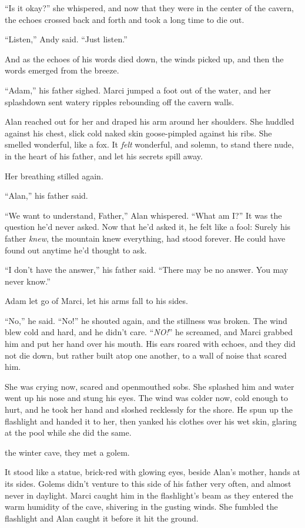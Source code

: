 ``Is it okay?'' she whispered, and now that they were in the center of
the cavern, the echoes crossed back and forth and took a long time to
die out.

``Listen,'' Andy said.  ``Just listen.''

And as the echoes of his words died down, the winds picked up, and
then the words emerged from the breeze.

``Adam,'' his father sighed.  Marci jumped a foot out of the water,
and her splashdown sent watery ripples rebounding off the cavern
walls.

Alan reached out for her and draped his arm around her shoulders.  She
huddled against his chest, slick cold naked skin goose-pimpled against
his ribs.  She smelled wonderful, like a fox.  It \textit{felt}
wonderful, and solemn, to stand there nude, in the heart of his
father, and let his secrets spill away.

Her breathing stilled again.

``Alan,'' his father said.

``We want to understand, Father,'' Alan whispered.  ``What am I?'' It
was the question he'd never asked.  Now that he'd asked it, he felt
like a fool:  Surely his father \textit{knew}, the mountain knew
everything, had stood forever.  He could have found out anytime he'd
thought to ask.

``I don't have the answer,'' his father said.  ``There may be no
answer.  You may never know.''

Adam let go of Marci, let his arms fall to his sides.

``No,'' he said.  ``No!'' he shouted again, and the stillness was
broken.  The wind blew cold and hard, and he didn't care. 
``\textit{NO!}'' he screamed, and Marci grabbed him and put her hand
over his mouth.  His ears roared with echoes, and they did not die
down, but rather built atop one another, to a wall of noise that
scared him.

She was crying now, scared and openmouthed sobs.  She splashed him and
water went up his nose and stung his eyes.  The wind was colder now,
cold enough to hurt, and he took her hand and sloshed recklessly for
the shore.  He spun up the flashlight and handed it to her, then
yanked his clothes over his wet skin, glaring at the pool while she
did the same.

 the winter cave, they met a golem.

It stood like a statue, brick-red with glowing eyes, beside Alan's
mother, hands at its sides.  Golems didn't venture to this side of his
father very often, and almost never in daylight.  Marci caught him in
the flashlight's beam as they entered the warm humidity of the cave,
shivering in the gusting winds.  She fumbled the flashlight and Alan
caught it before it hit the ground.

